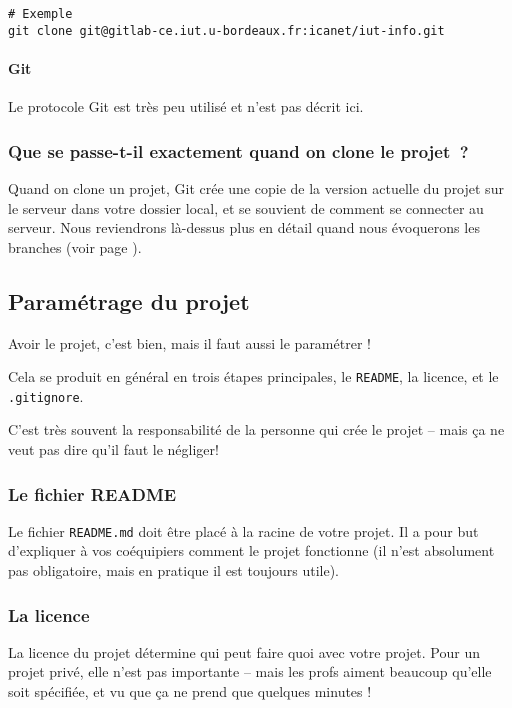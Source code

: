 \documentclass[10pt,a4paper]{article}
\begin{document}
\begin{verbatim}
# Exemple
git clone git@gitlab-ce.iut.u-bordeaux.fr:icanet/iut-info.git
\end{verbatim}

\paragraph{Git}

Le protocole Git est très peu utilisé et n'est pas décrit ici.

\subsubsection{Que se passe-t-il exactement quand on clone le projet~?}

Quand on clone un projet, Git crée une copie de la version actuelle du projet sur le serveur dans votre dossier local, et se souvient de comment se connecter au serveur. Nous reviendrons là-dessus plus en détail quand nous évoquerons les branches (voir page \pageref{branches}).

\subsection{Paramétrage du projet}

Avoir le projet, c'est bien, mais il faut aussi le paramétrer !

Cela se produit en général en trois étapes principales, le {\tt README}, la licence, et le {\tt .gitignore}.

C'est très souvent la responsabilité de la personne qui crée le projet -- mais ça ne veut pas dire qu'il faut le négliger!

\subsubsection{Le fichier README}

Le fichier {\tt README.md} doit être placé à la racine de votre projet. Il a pour but d'expliquer à vos coéquipiers comment le projet fonctionne (il n'est absolument pas obligatoire, mais en pratique il est toujours utile).

\subsubsection{La licence}

La licence du projet détermine qui peut faire quoi avec votre projet. Pour un projet privé, elle n'est pas importante -- mais les profs aiment beaucoup qu'elle soit spécifiée, et vu que ça ne prend que quelques minutes !
\end{document}
